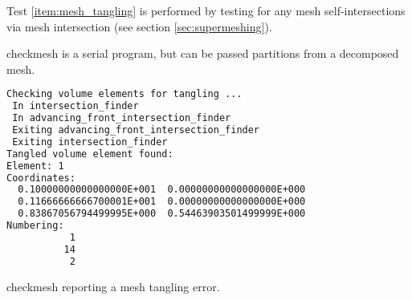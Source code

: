 Test \ref{item:mesh_tangling} is performed by testing for any mesh self-intersections
via mesh intersection (see section \ref{sec:supermeshing}).

checkmesh is a serial program, but can be passed partitions from a decomposed mesh.

\begin{example}
\begin{lstlisting}[language = Bash]
Checking volume elements for tangling ...
 In intersection_finder
 In advancing_front_intersection_finder
 Exiting advancing_front_intersection_finder
 Exiting intersection_finder
Tangled volume element found: 
Element: 1
Coordinates:
  0.10000000000000000E+001  0.00000000000000000E+000
  0.11666666666700001E+001  0.00000000000000000E+000
  0.83867056794499995E+000  0.54463903501499999E+000
Numbering:
           1
          14
           2
\end{lstlisting}
\caption{checkmesh reporting a mesh tangling error.}
\end{example}
